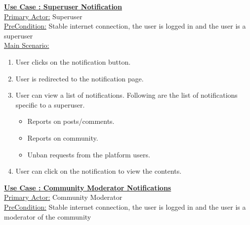 \documentclass[conference,compsoc]{IEEEtran}
\newcounter{UC}
\newcommand{\nextU}{\stepcounter{UC}\theUC}
\begin{document}
\underline{\textbf{Use Case \nextU: Superuser Notification}}\\

\underline{Primary Actor:} Superuser\\

\underline{PreCondition:} Stable internet connection, the user is logged in and the user is a superuser\\

\underline{Main Scenario:}\\
\begin{enumerate}
    \item User clicks on the notification button.
    \item User is redirected to the notification page.
    \item User can view a list of notifications. Following are the list of notifications specific to a superuser.
          \begin{itemize}
              \item Reports on posts/comments.
              \item Reports on community.
              \item Unban requests from the platform users.
          \end{itemize}
    \item User can click on the notification to view the contents.
\end{enumerate}

\underline{\textbf{Use Case \nextU: Community Moderator Notifications}}\\

\underline{Primary Actor:} Community Moderator\\

\underline{PreCondition:} Stable internet connection, the user is logged in and the user is a moderator of the community\\
\end{document}
